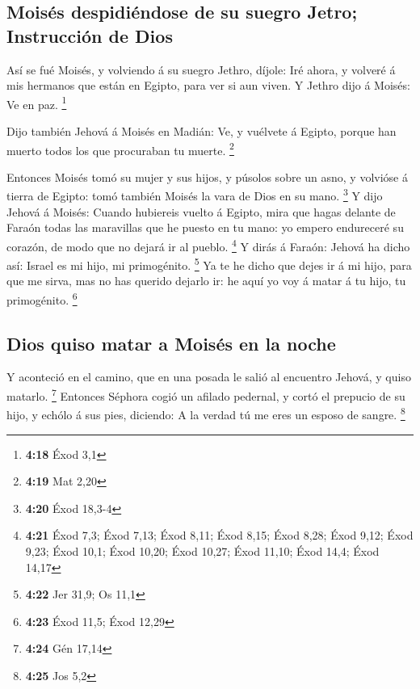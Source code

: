 \hypertarget{moisuxe9s-despidiuxe9ndose-de-su-suegro-jetro-instrucciuxf3n-de-dios}{%
\subsection{Moisés despidiéndose de su suegro Jetro; Instrucción de
Dios}\label{moisuxe9s-despidiuxe9ndose-de-su-suegro-jetro-instrucciuxf3n-de-dios}}

 Así se fué Moisés, y volviendo á su suegro Jethro, díjole:
Iré ahora, y volveré á mis hermanos que están en Egipto, para ver si aun
viven. Y Jethro dijo á Moisés: Ve en paz. \footnote{\textbf{4:18} Éxod
  3,1}

 Dijo también Jehová á Moisés en Madián: Ve, y vuélvete á
Egipto, porque han muerto todos los que procuraban tu muerte.
\footnote{\textbf{4:19} Mat 2,20}

 Entonces Moisés tomó su mujer y sus hijos, y púsolos sobre
un asno, y volvióse á tierra de Egipto: tomó también Moisés la vara de
Dios en su mano. \footnote{\textbf{4:20} Éxod 18,3-4}  Y
dijo Jehová á Moisés: Cuando hubiereis vuelto á Egipto, mira que hagas
delante de Faraón todas las maravillas que he puesto en tu mano: yo
empero endureceré su corazón, de modo que no dejará ir al pueblo.
\footnote{\textbf{4:21} Éxod 7,3; Éxod 7,13; Éxod 8,11; Éxod 8,15; Éxod
  8,28; Éxod 9,12; Éxod 9,23; Éxod 10,1; Éxod 10,20; Éxod 10,27; Éxod
  11,10; Éxod 14,4; Éxod 14,17}  Y dirás á Faraón: Jehová
ha dicho así: Israel es mi hijo, mi primogénito. \footnote{\textbf{4:22}
  Jer 31,9; Os 11,1}  Ya te he dicho que dejes ir á mi
hijo, para que me sirva, mas no has querido dejarlo ir: he aquí yo voy á
matar á tu hijo, tu primogénito. \footnote{\textbf{4:23} Éxod 11,5; Éxod
  12,29}

\hypertarget{dios-quiso-matar-a-moisuxe9s-en-la-noche}{%
\subsection{Dios quiso matar a Moisés en la
noche}\label{dios-quiso-matar-a-moisuxe9s-en-la-noche}}

 Y aconteció en el camino, que en una posada le salió al
encuentro Jehová, y quiso matarlo. \footnote{\textbf{4:24} Gén 17,14}
 Entonces Séphora cogió un afilado pedernal, y cortó el
prepucio de su hijo, y echólo á sus pies, diciendo: A la verdad tú me
eres un esposo de sangre. \footnote{\textbf{4:25} Jos 5,2}

